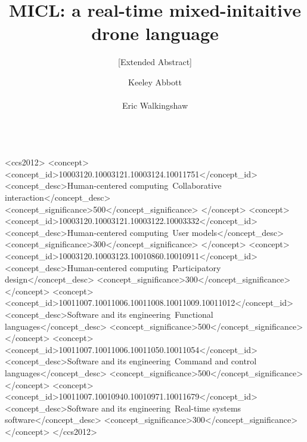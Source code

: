 \documentclass{sig-alternate-05-2015}
\begin{document}




\title{MICL: a real-time mixed-initaitive drone language}
\subtitle{[Extended Abstract]}

\author{
\alignauthor
Keeley Abbott\\
\\
\alignauthor
Eric Walkingshaw\\
\\
}

\maketitle
\begin{abstract}

\end{abstract}


%
%
\begin{CCSXML}
<ccs2012>
<concept>
<concept_id>10003120.10003121.10003124.10011751</concept_id>
<concept_desc>Human-centered computing~Collaborative interaction</concept_desc>
<concept_significance>500</concept_significance>
</concept>
<concept>
<concept_id>10003120.10003121.10003122.10003332</concept_id>
<concept_desc>Human-centered computing~User models</concept_desc>
<concept_significance>300</concept_significance>
</concept>
<concept>
<concept_id>10003120.10003123.10010860.10010911</concept_id>
<concept_desc>Human-centered computing~Participatory design</concept_desc>
<concept_significance>300</concept_significance>
</concept>
<concept>
<concept_id>10011007.10011006.10011008.10011009.10011012</concept_id>
<concept_desc>Software and its engineering~Functional languages</concept_desc>
<concept_significance>500</concept_significance>
</concept>
<concept>
<concept_id>10011007.10011006.10011050.10011054</concept_id>
<concept_desc>Software and its engineering~Command and control languages</concept_desc>
<concept_significance>500</concept_significance>
</concept>
<concept>
<concept_id>10011007.10010940.10010971.10011679</concept_id>
<concept_desc>Software and its engineering~Real-time systems software</concept_desc>
<concept_significance>300</concept_significance>
</concept>
</ccs2012>
\end{CCSXML}
\end{document}
